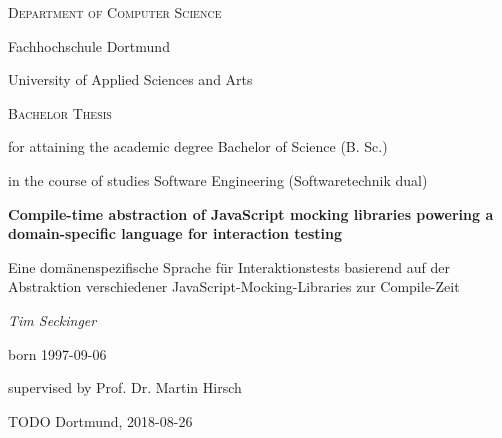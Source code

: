 {\centering
  {\small\scshape Department of Computer Science \par}
  {\large Fachhochschule Dortmund \par}
  {\large University of Applied Sciences and Arts \par}

  \vspace{10mm}

  {\large\scshape Bachelor Thesis\par}
  \vspace{5mm}
  {\small
  for attaining the academic degree Bachelor of Science (B. Sc.)\par
  in the course of studies Software Engineering (Softwaretechnik dual)\par
  }

  \vspace{20mm}

  {\huge\bfseries
    Compile-time abstraction of JavaScript mocking libraries
    powering a domain-specific language for interaction testing
  }

  {\small
    Eine domänenspezifische Sprache für Interaktionstests
    basierend auf der Abstraktion verschiedener JavaScript-Mocking-Libraries zur Compile-Zeit
  \par}

  \vspace{20mm}

  {\large\itshape
  Tim Seckinger\par
  \small born 1997-09-06\par
  }
  \vspace{5mm}
  {\small supervised by Prof. Dr. Martin Hirsch\par}

  \vfill

  {\large TODO Dortmund, 2018-08-26}
}
